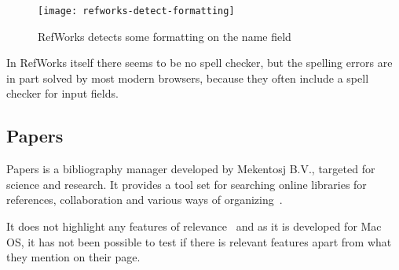 \begin{figure}
    \centering
    \texttt{[image: refworks-detect-formatting]}
    \caption{RefWorks detects some formatting on the name field}
    \label{fig:refworks-detect-formatting}
\end{figure}

In RefWorks itself there seems to be no spell checker, but the
spelling errors are in part solved by most modern browsers, because
they often include a spell checker for input fields.

\subsection{Papers}
Papers is a bibliography manager developed by Mekentosj B.V., targeted
for science and research.  It provides a tool set for searching online
libraries for references, collaboration and various ways of
organizing~\cite{papers_features}.

It does not highlight any features of relevance~\cite{papers_features}
and as it is developed for Mac OS, it has not been possible to test if
there is relevant features apart from what they mention on their page.





